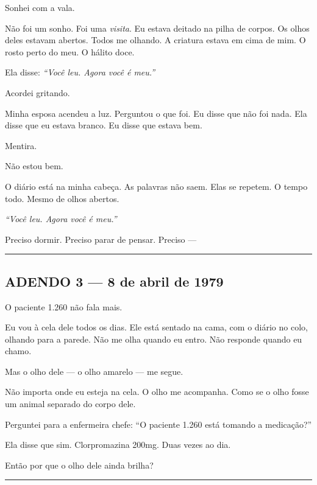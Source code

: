 \noindent Sonhei com a vala.

\noindent Não foi um sonho. Foi uma \textit{visita}. Eu estava deitado na pilha de corpos. Os olhos deles estavam abertos. Todos me olhando. A criatura estava em cima de mim. O rosto perto do meu. O hálito doce.

\noindent Ela disse: \textit{\textquotedblleft{}Você leu. Agora você é meu.\textquotedblright{}}

\noindent Acordei gritando.

\noindent Minha esposa acendeu a luz. Perguntou o que foi. Eu disse que não foi nada. Ela disse que eu estava branco. Eu disse que estava bem.

\noindent Mentira.

\noindent Não estou bem.

\noindent O diário está na minha cabeça. As palavras não saem. Elas se repetem. O tempo todo. Mesmo de olhos abertos.

\noindent \textit{\textquotedblleft{}Você leu. Agora você é meu.\textquotedblright{}}

\noindent Preciso dormir. Preciso parar de pensar. Preciso ---

\vspace{0.5em}\noindent\rule{\textwidth}{0.5pt}\vspace{0.5em}

\subsection*{ADENDO 3 --- 8 de abril de 1979}

\noindent O paciente 1.260 não fala mais.

\noindent Eu vou à cela dele todos os dias. Ele está sentado na cama, com o diário no colo, olhando para a parede. Não me olha quando eu entro. Não responde quando eu chamo.

\noindent Mas o olho dele --- o olho amarelo --- me segue.

\noindent Não importa onde eu esteja na cela. O olho me acompanha. Como se o olho fosse um animal separado do corpo dele.

\noindent Perguntei para a enfermeira chefe: \textquotedblleft{}O paciente 1.260 está tomando a medicação?\textquotedblright{}

\noindent Ela disse que sim. Clorpromazina 200mg. Duas vezes ao dia.

\noindent Então por que o olho dele ainda brilha?

\vspace{0.5em}\noindent\rule{\textwidth}{0.5pt}\vspace{0.5em}

